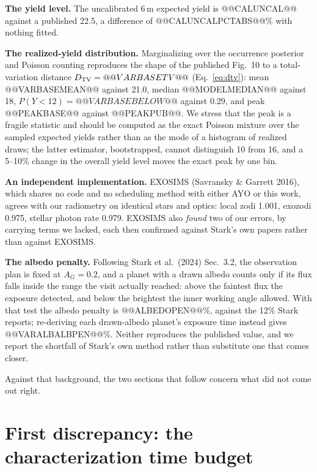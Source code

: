 \documentclass[11pt,a4paper]{article}
\begin{document}
\textbf{The yield level.} The uncalibrated $6\,$m expected yield is @@CALUNCAL@@ against a
published 22.5, a difference of @@CALUNCALPCTABS@@\% with nothing fitted.

\textbf{The realized-yield distribution.} Marginalizing over the occurrence posterior and
Poisson counting reproduces the shape of the published Fig.~10 to a total-variation distance
$D_{\rm TV} = @@VARBASETV@@$ (Eq.~\ref{eq:dtv}): mean @@VARBASEMEAN@@ against 21.0, median @@MODELMEDIAN@@ against 18,
$P(Y<12) = @@VARBASEBELOW@@$ against 0.29, and peak @@PEAKBASE@@ against @@PEAKPUB@@. We stress
that the peak is a fragile statistic and should be computed as the exact Poisson mixture over the
sampled expected yields rather than as the mode of a histogram of realized draws; the latter
estimator, bootstrapped, cannot distinguish 10 from 16, and a 5--10\% change in the overall yield
level moves the exact peak by one bin.

\textbf{An independent implementation.} EXOSIMS (Savransky \& Garrett 2016), which shares no code and no
scheduling method with either AYO or this work, agrees with our radiometry on identical stars and
optics: local zodi 1.001, exozodi 0.975, stellar photon rate 0.979. EXOSIMS also \emph{found} two
of our errors, by carrying terms we lacked, each then confirmed against Stark's own papers rather
than against EXOSIMS.

\textbf{The albedo penalty.} Following Stark et al.\ (2024) Sec.~3.2, the observation plan is
fixed at $A_G = 0.2$, and a planet with a drawn albedo counts only if its flux falls inside the
range the visit actually reached: above the faintest flux the exposure detected, and below the
brightest the inner working angle allowed. With that test the albedo penalty is @@ALBEDOPEN@@\%,
against the 12\% Stark reports; re-deriving each drawn-albedo planet's exposure time instead
gives @@VARALBALBPEN@@\%. Neither reproduces the published value, and we report the shortfall
of Stark's own method rather than substitute one that comes closer.

Against that background, the two sections that follow concern what did not come out right.

\section{First discrepancy: the characterization time budget}
\label{sec:char}
\end{document}
